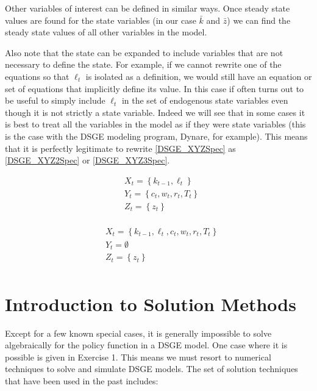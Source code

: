 \documentclass[letterpaper,12pt]{article}
\theoremstyle{definition}
\begin{document}
\begin{spacing}{1.5}
		Other variables of interest can be defined in similar ways. Once steady state values are found for the state variables (in our case $\bar k$ and $\bar z$) we can find the steady state values of all other variables in the model.

		Also note that the state can be expanded to include variables that are not necessary to define the state. For example, if we cannot rewrite one of the equations so that $\ell_t$ is isolated as a definition, we would still have an equation or set of equations that implicitly define its value. In this case if often turns out to be useful to simply include $\ell_t$ in the set of endogenous state variables even though it is not strictly a state variable. Indeed we will see that in some cases it is best to treat all the variables in the model as if they were state variables (this is the case with the DSGE modeling program, Dynare, for example). This means that it is perfectly legitimate to rewrite \eqref{DSGE_XYZSpec} as \eqref{DSGE_XYZ2Spec} or \eqref{DSGE_XYZ3Spec}.

		\begin{equation}\label{DSGE_XYZ2Spec}
		\begin{aligned}
		& X_t  = \left\{k_{t-1},\ell_t\right\} \\
		& Y_t  = \left\{c_t,w_t,r_t,T_t\right\} \\
		& Z_t  = \left\{z_t\right\} \\
		\end{aligned}
		\end{equation}

		\begin{equation}\label{DSGE_XYZ3Spec}
		\begin{aligned}
		& X_t = \left\{k_{t-1},\ell_t,c_t,w_t,r_t,T_t\right\} \\
		& Y_t = \emptyset \\
		& Z_t = \left\{z_t\right\} \\
		\end{aligned}
		\end{equation}

\section{Introduction to Solution Methods}\label{DSGE_Solutions}
	Except for a few known special cases, it is generally impossible to solve algebraically for the policy function in a DSGE model.  One case where it is possible is given in Exercise 1.  This means we must resort to numerical techniques to solve and simulate DSGE models. The set of solution techniques that have been used in the past includes:


\end{spacing}
\end{document}
